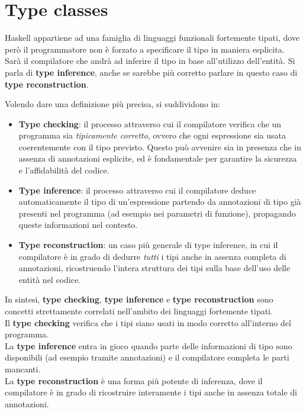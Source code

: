 \documentclass{article}
\begin{document}
\pagestyle{empty}

\section*{Type classes}
\large

Haskell appartiene ad una famiglia di linguaggi funzionali fortemente tipati, dove però il programmatore non è forzato a specificare il tipo in maniera esplicita. Sarà il compilatore che andrà ad inferire il tipo in base all'utilizzo dell'entità. Si parla di \textbf{type inference}, anche se sarebbe più corretto parlare in questo caso di \textbf{type reconstruction}.

Volendo dare una definizione più precisa, si suddividono in:
\begin{itemize}
    \item \textbf{Type checking}: il processo attraverso cui il compilatore verifica che un programma sia \textit{tipicamente corretto}, ovvero che ogni espressione sia usata coerentemente con il tipo previsto. Questo può avvenire sia in presenza che in assenza di annotazioni esplicite, ed è fondamentale per garantire la sicurezza e l'affidabilità del codice.
    \item \textbf{Type inference}: il processo attraverso cui il compilatore deduce automaticamente il tipo di un'espressione partendo da annotazioni di tipo già presenti nel programma (ad esempio nei parametri di funzione), propagando queste informazioni nel contesto.
    \item \textbf{Type reconstruction}: un caso più generale di type inference, in cui il compilatore è in grado di dedurre \textit{tutti} i tipi anche in assenza completa di annotazioni, ricostruendo l'intera struttura dei tipi sulla base dell'uso delle entità nel codice.
\end{itemize}

In sintesi, \textbf{type checking}, \textbf{type inference} e \textbf{type reconstruction} sono concetti strettamente correlati nell'ambito dei linguaggi fortemente tipati.\\
Il \textbf{type checking} verifica che i tipi siano usati in modo corretto all'interno del programma.\\
La \textbf{type inference} entra in gioco quando parte delle informazioni di tipo sono disponibili (ad esempio tramite annotazioni) e il compilatore completa le parti mancanti.\\
La \textbf{type reconstruction} è una forma più potente di inferenza, dove il compilatore è in grado di ricostruire interamente i tipi anche in assenza totale di annotazioni. 
\end{document}
